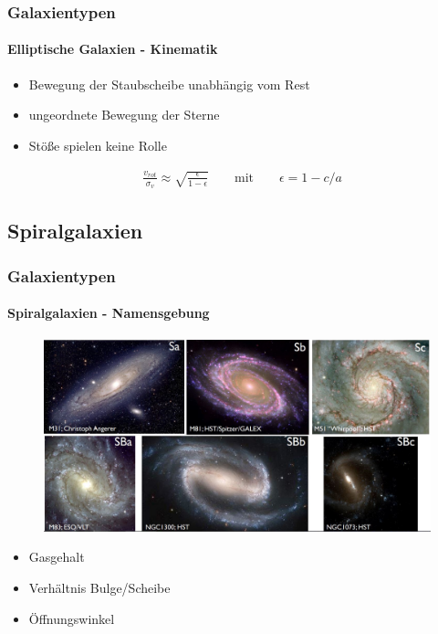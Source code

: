 \begin{frame}
\frametitle{Galaxientypen}
\framesubtitle{Elliptische Galaxien - Kinematik}

\begin{itemize}
\item Bewegung der Staubscheibe unabhängig vom Rest
\item ungeordnete Bewegung der Sterne
\item Stöße spielen keine Rolle
\end{itemize}


\begin{align*}
&\frac{v_{rot}}{\sigma_v} \approx \sqrt{\frac{\epsilon}{1 - \epsilon}} \qquad \text{mit} \qquad \epsilon = 1 - c/a
\end{align*}

\end{frame}


\subsection{Spiralgalaxien}

\begin{frame}
\frametitle{Galaxientypen}
\framesubtitle{Spiralgalaxien - Namensgebung}

\begin{figure}
\includegraphics[scale=0.25]{Spiral_Namensgebung.jpg}
\end{figure}

\begin{itemize}
\item Gasgehalt
\item Verhältnis Bulge/Scheibe
\item Öffnungswinkel
\end{itemize}

\end{frame}


